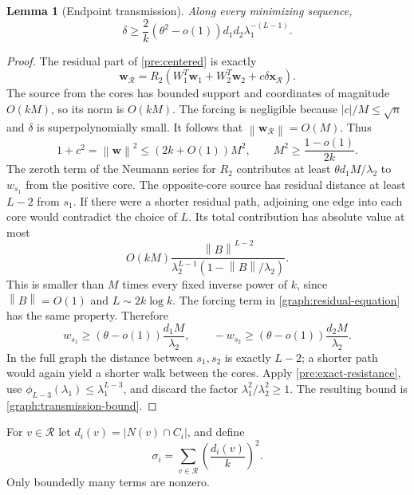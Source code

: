 \documentclass[11pt,a4paper]{article}
\numberwithin{equation}{section}
\newtheorem{lemma}[theorem]{Lemma}
\theoremstyle{definition}
\theoremstyle{remark}
\newcommand{\norm}[1]{\left\lVert#1\right\rVert}
\begin{document}
\begin{lemma}[Endpoint transmission]\label{graph:transmission}
Along every minimizing sequence,
\begin{equation}\label{graph:transmission-bound}
 \delta\ge\frac2k(\theta^2-o(1))d_1d_2\lambda_1^{-(L-1)}.
\end{equation}
\end{lemma}
\begin{proof}
The residual part of \eqref{pre:centered} is exactly
\begin{equation}\label{graph:residual-equation}
 \mathbf w_{\mathcal R}
 =R_2(W_1^T\mathbf w_1+W_2^T\mathbf w_2+c\delta\mathbf x_{\mathcal R}).
\end{equation}
The source from the cores has bounded support and coordinates of
magnitude $O(kM)$, so its norm is $O(kM)$. The forcing is negligible
because $|c|/M\le\sqrt n$ and $\delta$ is superpolynomially small.
It follows that $\norm{\mathbf w_{\mathcal R}}=O(M)$. Thus
\[
 1+c^2=\norm{\mathbf w}^2\le(2k+O(1))M^2,
 \qquad M^2\ge\frac{1-o(1)}{2k}.
\]
The zeroth term of the Neumann series for $R_2$ contributes at least
$\theta d_1M/\lambda_2$ to $w_{s_1}$ from the positive core. The
opposite-core source has residual distance at least $L-2$ from $s_1$.
If there were a shorter residual path, adjoining one edge into each
core would contradict the choice of $L$. Its total contribution has
absolute value at most
\[
 O(kM)\frac{\norm B^{L-2}}
 {\lambda_2^{L-1}(1-\norm B/\lambda_2)}.
\]
This is smaller than $M$ times every fixed inverse power of $k$, since
$\norm B=O(1)$ and $L\sim2k\log k$. The forcing term in
\eqref{graph:residual-equation} has the same property. Therefore
\[
 w_{s_1}\ge(\theta-o(1))\frac{d_1M}{\lambda_2},\qquad
 -w_{s_2}\ge(\theta-o(1))\frac{d_2M}{\lambda_2}.
\]
In the full graph the distance between $s_1,s_2$ is exactly $L-2$;
a shorter path would again yield a shorter walk between the cores.
Apply \eqref{pre:exact-resistance}, use
$\phi_{L-3}(\lambda_1)\le\lambda_1^{L-3}$, and discard the factor
$\lambda_1^2/\lambda_2^2\ge1$. The resulting bound is
\eqref{graph:transmission-bound}.
\end{proof}

For $v\in\mathcal R$ let $d_i(v)=|N(v)\cap C_i|$, and define
\begin{equation}\label{graph:attachment-mass}
 \sigma_i=\sum_{v\in\mathcal R}\left(\frac{d_i(v)}k\right)^2.
\end{equation}
Only boundedly many terms are nonzero.
\end{document}
